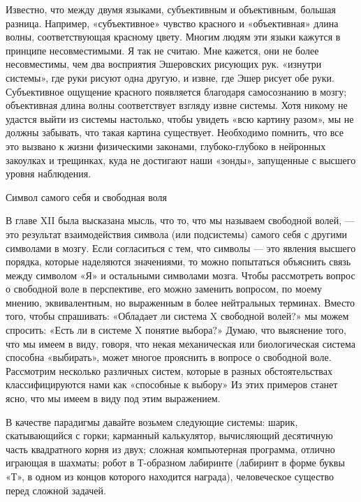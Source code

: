 \documentclass[../main.tex]{subfiles}
\begin{document}
Известно, что между двумя языками, субъективным и объективным, большая разница. Например, «субъективное» чувство красного и «объективная» длина волны, соответствующая красному цвету. Многим людям эти языки кажутся в принципе несовместимыми. Я так не считаю. Мне кажется, они не более несовместимы, чем два восприятия Эшеровских рисующих рук. «изнутри системы», где руки рисуют одна другую, и извне, где Эшер рисует обе руки. Субъективное ощущение красного появляется благодаря самосознанию в мозгу; объективная длина волны соответствует взгляду извне системы. Хотя никому не удастся выйти из системы настолько, чтобы увидеть «всю картину разом», мы не должны забывать, что такая картина существует. Необходимо помнить, что все это вызвано к жизни физическими законами, глубоко-глубоко в нейронных закоулках и трещинках, куда не достигают наши «зонды», запущенные с высшего уровня наблюдения.

Символ самого себя и свободная воля

В главе XII была высказана мысль, что то, что мы называем свободной волей, --- это результат взаимодействия символа (или подсистемы) самого себя с другими символами в мозгу. Если согласиться с тем, что символы --- это явления высшего порядка, которые наделяются значениями, то можно попытаться объяснить связь между символом «Я» и остальными символами мозга. Чтобы рассмотреть вопрос о свободной воле в перспективе, его можно заменить вопросом, по моему мнению, эквивалентным, но выраженным в более нейтральных терминах. Вместо того, чтобы спрашивать: «Обладает ли система X свободной волей?» мы можем спросить: «Есть ли в системе X понятие выбора?» Думаю, что выяснение того, что мы имеем в виду, говоря, что некая механическая или биологическая система способна «выбирать», может многое прояснить в вопросе о свободной воле. Рассмотрим несколько различных систем, которые в разных обстоятельствах классифицируются нами как «способные к выбору» Из этих примеров станет ясно, что мы имеем в виду под этим выражением.

В качестве парадигмы давайте возьмем следующие системы: шарик, скатывающийся с горки; карманный калькулятор, вычисляющий десятичную часть квадратного корня из двух; сложная компьютерная программа, отлично играющая в шахматы; робот в Т-образном лабиринте (лабиринт в форме буквы «Т», в одном из концов которого находится награда), человеческое существо перед сложной задачей.
\end{document}

